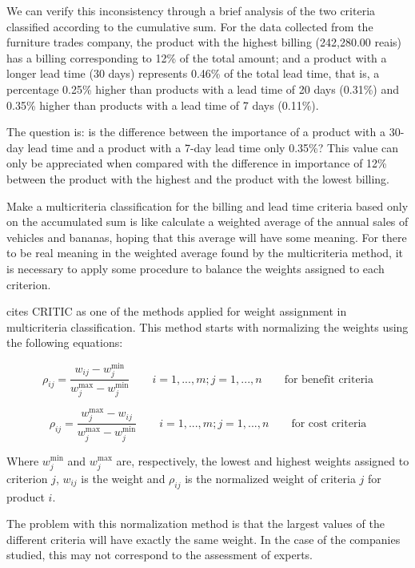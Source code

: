 \documentclass[10pt,fleqn,a4paper,twoside]{article}
\begin{document}
We can verify this inconsistency through a brief analysis of the two criteria classified according to the cumulative sum. For the data collected from the furniture trades company, the product with the highest billing (242,280.00 reais) has a billing corresponding to 12\% of the total amount; and a product with a longer lead time (30 days) represents 0.46\% of the total lead time, that is, a percentage 0.25\% higher than products with a lead time of 20 days (0.31\%) and 0.35\% higher than products with a lead time of 7 days (0.11\%).  

The question is: is the difference between the importance of a product with a 30-day lead time and a product with a 7-day lead time only 0.35\%? This value can only be appreciated when compared with the difference in importance of 12\% between the product with the highest and the product with the lowest billing. 

Make a multicriteria classification for the billing and lead time criteria based only on the accumulated sum is like calculate a weighted average of the annual sales of vehicles and bananas, hoping that this average will have some meaning. For there to be real meaning in the weighted average found by the multicriteria method, it is necessary to apply some procedure to balance the weights assigned to each criterion.
	
	\citet{Odu2019} cites CRITIC as one of the methods applied for weight assignment in multicriteria classification. This method starts with normalizing the weights using the following equations:
	
	\begin{equation}
		\rho_{ij} = \frac{w_{ij} - w_{j}^{\min}}{w_{j}^{\max} - w_{j}^{\min}} \qquad i=1,...,m; j = 1, ..., n \qquad \textrm{for benefit criteria}
	\end{equation}
	
	\begin{equation}
		\rho_{ij} = \frac{w_{j}^{\max} - w_{ij}}{w_{j}^{\max} - w_{j}^{\min}} \qquad i=1,...,m; j = 1, ..., n \qquad \textrm{for cost criteria}
	\end{equation}
	
	Where $w_{j}^{\min}$ and $w_{j}^{\max}$ are, respectively, the lowest and highest weights assigned to criterion $j$, $w_{ij}$ is the weight and $\rho_{ij}$ is the normalized weight of criteria $j$ for product $i$. 
	 
	The problem with this normalization method is that the largest values of the different criteria will have exactly the same weight. In the case of the companies studied, this may not correspond to the assessment of experts. 
	
\end{document}
